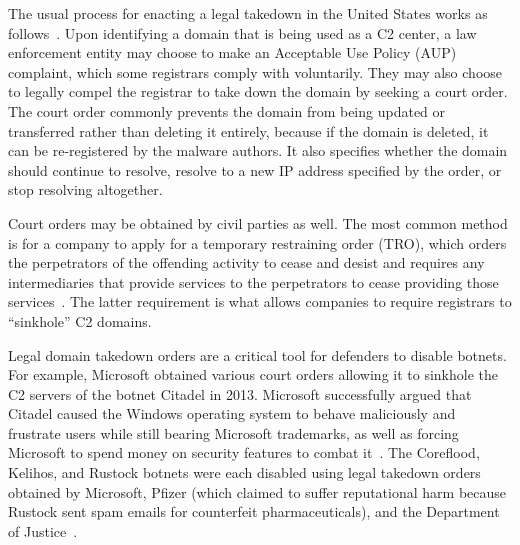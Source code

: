 The usual process for enacting a legal takedown in the United States works as 
follows~\cite{knight_domain_2015}. Upon identifying a domain that is being used 
as a C2 center, a law enforcement entity may choose to make 
an Acceptable Use Policy (AUP) complaint, which some registrars comply with 
voluntarily. They may also choose to legally compel the registrar to take down 
the domain by 
seeking a court order. The court order commonly prevents the domain from being 
updated or transferred rather than deleting it entirely, because if 
the domain is deleted, it can be re-registered by the malware authors. It also 
specifies whether the domain should continue to resolve, resolve to a new IP 
address specified by the order, or stop resolving altogether. 

Court orders may be obtained by civil parties as well. The most common method 
is for a company to 
apply for a temporary restraining order (TRO), which orders the perpetrators 
of the offending 
activity to cease and desist and requires any intermediaries that provide 
services to the 
perpetrators to cease providing those services~\cite{kesari_deterring_2017}. 
The latter requirement 
is what allows companies to require registrars to ``sinkhole'' C2 
domains. 

Legal domain takedown orders are a critical tool for defenders to disable 
botnets. For example, 
Microsoft obtained various court orders allowing it to sinkhole the C2 servers 
of the botnet 
Citadel in 2013. Microsoft successfully argued that Citadel caused the Windows 
operating system to 
behave maliciously and frustrate users while still bearing Microsoft 
trademarks, as well as forcing 
Microsoft to spend money on security features to combat 
it~\cite{lerner_microsoft_2014}. The 
Coreflood, Kelihos, and Rustock botnets were each disabled using legal 
takedown orders obtained by 
Microsoft, Pfizer (which claimed to suffer reputational harm because Rustock 
sent spam emails for 
counterfeit pharmaceuticals), and the Department of 
Justice~\cite{kesari_deterring_2017}. 


